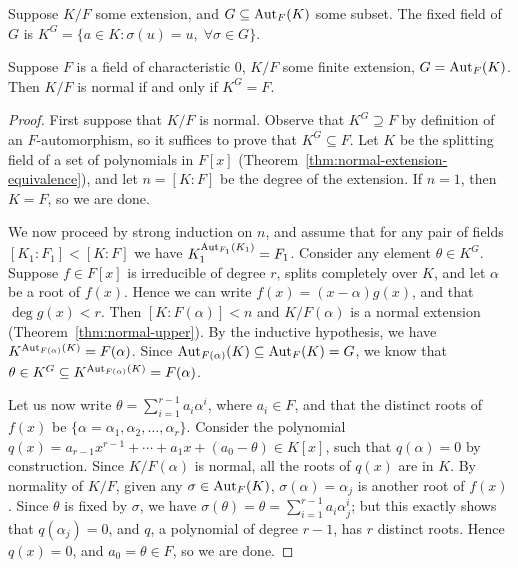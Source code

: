 \begin{definition}
    Suppose \(K/F\) some extension, and \(G \subseteq \operatorname{Aut}_F(K)\) some subset.
    The fixed field of \(G\) is
    \(K^G =\{a \in K: \sigma(u) = u,\; \forall \sigma \in G\}\).
\end{definition}
\begin{proposition}\label{prop:fixed-field-normal}
    Suppose \(F\) is a field of characteristic 0,
    \(K/F\) some finite extension, \(G = \operatorname{Aut}_F(K)\).
    Then \(K/F\) is normal if and only if \(K^G = F\).
\end{proposition}
\begin{proof}
    First suppose that \(K/F\) is normal.
    Observe that \(K^G \supseteq F\) by definition of an \(F\)-automorphism,
    so it suffices to prove that \(K^G \subseteq F\).
    Let \(K\) be the splitting field of a set of polynomials in \(F[x]\)
    (Theorem~\ref{thm:normal-extension-equivalence}),
    and let \(n = [K:F]\) be the degree of the extension.
    If \(n = 1\), then \(K = F\), so we are done.

    We now proceed by strong induction on \(n\),
    and assume that for any pair of fields \([K_1:F_1] < [K:F]\) we have \(K_1^{\operatorname{Aut}_{F_1}(K_1)} = F_1\).
    Consider any element \(\theta \in K^G\).
    Suppose \(f \in F[x]\) is irreducible of degree \(r\),
    splits completely over \(K\), and let \(\alpha\) be a root of \(f(x)\).
    Hence we can write \(f(x) = (x-\alpha)g(x)\), and that \(\deg g(x) < r\).
    Then \([K:F(\alpha)] < n\) and \(K/F(\alpha)\) is a normal extension (Theorem~\ref{thm:normal-upper}).
    By the inductive hypothesis, we have \(K^{\operatorname{Aut}_{F(\alpha)}(K)} = F(\alpha)\).
    Since \(\operatorname{Aut}_{F(\alpha)}(K) \subseteq \operatorname{Aut}_F(K) = G\),
    we know that \(\theta \in K^G \subseteq K^{\operatorname{Aut}_{F(\alpha)}(K)} = F(\alpha)\).

    Let us now write \(\theta = \sum_{i=1}^{r-1} a_i \alpha^i\), where \(a_i \in F\),
    and that the distinct roots of \(f(x)\) be \(\{\alpha=\alpha_1,\alpha_2,\hdots,\alpha_r\}\).
    Consider the polynomial \(q(x) = a_{r-1} x^{r-1} + \cdots + a_1 x + (a_0 - \theta) \in K[x]\),
    such that \(q(\alpha) = 0\) by construction.
    Since \(K/F(\alpha)\) is normal, all the roots of \(q(x)\) are in \(K\).
    By normality of \(K/F\), given any \(\sigma \in \operatorname{Aut}_F(K)\),
    \(\sigma(\alpha) = \alpha_j\) is another root of \(f(x)\).
    Since \(\theta\) is fixed by \(\sigma\),
    we have \(\sigma(\theta) = \theta = \sum_{i=1}^{r-1} a_i \alpha_j^i\);
    but this exactly shows that \(q(\alpha_j) = 0\), and \(q\), a polynomial of degree \(r-1\),
    has \(r\) distinct roots.
    Hence \(q(x) = 0\), and \(a_0 = \theta \in F\), so we are done.


\end{proof}
